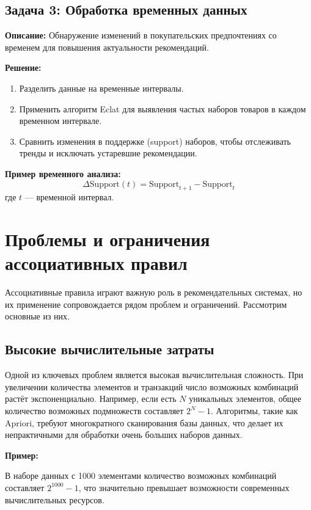 \subsection{Задача 3: Обработка временных данных}
\textbf{Описание:} 
Обнаружение изменений в покупательских предпочтениях со временем для повышения актуальности рекомендаций.

\textbf{Решение:}
\begin{enumerate}
    \item Разделить данные на временные интервалы.
    \item Применить алгоритм Eclat для выявления частых наборов товаров в каждом временном интервале.
    \item Сравнить изменения в поддержке (support) наборов, чтобы отслеживать тренды и исключать устаревшие рекомендации.
\end{enumerate}

\textbf{Пример временного анализа:}
\begin{equation}
    \Delta \text{Support}(t) = \text{Support}_{t+1} - \text{Support}_{t}
\end{equation}
где $t$ — временной интервал.



\section{Проблемы и ограничения ассоциативных правил}

Ассоциативные правила играют важную роль в рекомендательных системах, но их применение сопровождается рядом проблем и ограничений. Рассмотрим основные из них.

\subsection{Высокие вычислительные затраты}

Одной из ключевых проблем является высокая вычислительная сложность. При увеличении количества элементов и транзакций число возможных комбинаций растёт экспоненциально. Например, если есть $N$ уникальных элементов, общее количество возможных подмножеств составляет $2^N - 1$. Алгоритмы, такие как Apriori, требуют многократного сканирования базы данных, что делает их непрактичными для обработки очень больших наборов данных.

\textbf{Пример:}

В наборе данных с 1000 элементами количество возможных комбинаций составляет $2^{1000} - 1$, что значительно превышает возможности современных вычислительных ресурсов.

